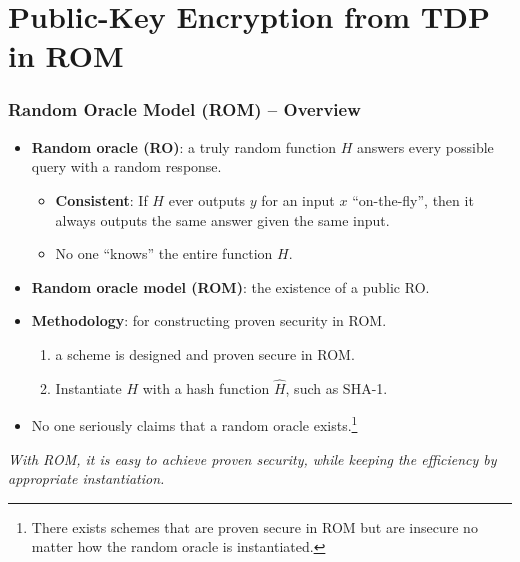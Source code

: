 \section{Public-Key Encryption from TDP in ROM}
\begin{frame}\frametitle{Random Oracle Model (ROM) -- Overview}
\begin{itemize}
\item \textbf{Random oracle (RO)}: a truly random function $H$ answers every possible query with a random response.
\begin{itemize}
\item \textbf{Consistent}: If $H$ ever outputs $y$ for an input $x$ ``on-the-fly'', then it always outputs the same answer given the same input.
\item No one ``knows'' the entire function $H$.
\end{itemize}
\item \textbf{Random oracle model (ROM)}: the existence of a public RO.
\item \textbf{Methodology}: for constructing proven security in ROM.
\begin{enumerate}
\item a scheme is designed and proven secure in ROM.
\item Instantiate $H$ with a hash function $\hat{H}$, such as SHA-1.
\end{enumerate}
\item \alert{No one seriously claims that a random oracle exists}.\footnote{There exists schemes that are proven secure in ROM but are insecure no matter how the random oracle is instantiated.}
\end{itemize}
\emph{With ROM, it is easy to achieve proven security, while keeping the efficiency by appropriate instantiation.}
\end{frame}
